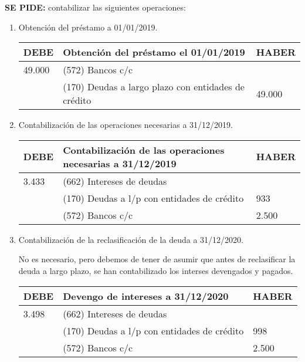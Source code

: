 \textbf{SE PIDE:} contabilizar las siguientes operaciones:
\begin{enumerate}[label=\alph*)]


\item Obtención del préstamo a 01/01/2019.

\begin{table}[H]
\centering
\begin{tabular}{|p{2cm}|p{8cm}|p{2cm}|}
\hline
\rowcolor{blue!30}
\textbf{DEBE} & \textbf{Obtención del préstamo el 01/01/2019} & \textbf{HABER} \\ \hline
49.000 & (572) Bancos c/c & \\ \hline
& (170) Deudas a largo plazo con entidades de crédito & 49.000 \\ \hline
\end{tabular}
\end{table}

\item Contabilización de las operaciones necesarias a 31/12/2019.

\begin{table}[H]
\centering
\begin{tabular}{|p{2cm}|p{8cm}|p{2cm}|}
\hline
\rowcolor{blue!30}
\textbf{DEBE} & \textbf{Contabilización de las operaciones necesarias a 31/12/2019} & \textbf{HABER} \\ \hline
3.433 & (662) Intereses de deudas & \\ \hline
& (170) Deudas a l/p con entidades de crédito & 933 \\ \hline
& (572) Bancos c/c & 2.500 \\ \hline
\end{tabular}
\end{table}

\item Contabilización de la reclasificación de la deuda a 31/12/2020.

No es necesario, pero debemos de tener de asumir que antes de reclasificar la deuda a largo plazo, se han contabilizado los interses devengados y pagados.

\begin{table}[H]
\centering
\begin{tabular}{|p{2cm}|p{8cm}|p{2cm}|}
\hline
\rowcolor{blue!30}
\textbf{DEBE} & \textbf{Devengo de intereses a 31/12/2020} & \textbf{HABER} \\ \hline
3.498 & (662) Intereses de deudas & \\ \hline
& (170) Deudas a l/p con entidades de crédito & 998 \\ \hline
& (572) Bancos c/c & 2.500 \\ \hline
\end{tabular}
\end{table}


\end{enumerate}
